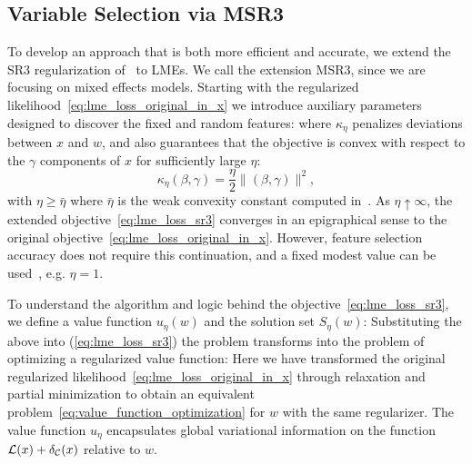 \subsection{Variable Selection via MSR3}

To develop an approach that is both more efficient and accurate, we extend the SR3 regularization of~\cite{Zheng2019SR3} to LMEs. 
We call the extension MSR3, since we are focusing on mixed effects models. 
Starting with the regularized likelihood~\eqref{eq:lme_loss_original_in_x} we introduce auxiliary parameters designed to discover the 
fixed and random features: 
where $\kappa_\eta$ penalizes deviations between $x$ and $w$, and also guarantees that the objective is convex with respect to the $\gamma$
components of $x$ for sufficiently large $\eta$:
\begin{equation}
\label{eq:kappa}
\kappa_{\eta} (\beta, \gamma) = \frac{\eta}{2}\|(\beta,\gamma)\|^2 ,
\end{equation}
with $\eta\ge\bar\eta$ where $\bar \eta$ is the weak convexity constant
computed in~\cite[Section 5.1]{Theory1}.
As $\eta \uparrow \infty$, the extended objective~\eqref{eq:lme_loss_sr3} converges in an epigraphical sense to the original objective~\eqref{eq:lme_loss_original_in_x}. 
However, feature selection accuracy does not require this continuation, and a fixed 
modest value can be used~\citep{Zheng2019SR3}, e.g. $\eta=1$.

To understand the algorithm and logic behind the objective~\eqref{eq:lme_loss_sr3}, we define a value function $u_\eta(w)$ and the solution set $S_\eta(w)$:
Substituting the above into (\ref{eq:lme_loss_sr3}) the problem transforms into the problem of optimizing a regularized value function:
Here we have transformed the original regularized likelihood~\eqref{eq:lme_loss_original_in_x}  %
through relaxation and partial 
minimization to obtain an equivalent problem~\eqref{eq:value_function_optimization} 
for $w$ with the same regularizer. The value function $u_\eta$ encapsulates 
global variational information on the function $\operatorname{\mathcal{L}}(x) + \delta_{\mathcal{C}}(x)$
relative to $w$.

